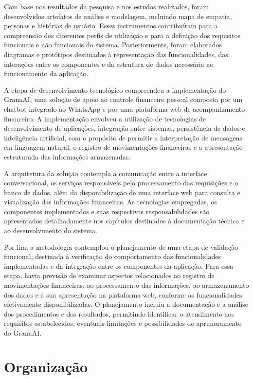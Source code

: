 Com base nos resultados da pesquisa e nos estudos realizados, foram desenvolvidos artefatos de análise e modelagem, incluindo mapa de empatia, personas e histórias de usuário. Esses instrumentos contribuíram para a compreensão dos diferentes perfis de utilização e para a definição dos requisitos funcionais e não funcionais do sistema. Posteriormente, foram elaborados diagramas e protótipos destinados à representação das funcionalidades, das interações entre os componentes e da estrutura de dados necessária ao funcionamento da aplicação.

A etapa de desenvolvimento tecnológico compreendeu a implementação do GranaAI, uma solução de apoio ao controle financeiro pessoal composta por um chatbot integrado ao WhatsApp e por uma plataforma web de acompanhamento financeiro. A implementação envolveu a utilização de tecnologias de desenvolvimento de aplicações, integração entre sistemas, persistência de dados e inteligência artificial, com o propósito de permitir a interpretação de mensagens em linguagem natural, o registro de movimentações financeiras e a apresentação estruturada das informações armazenadas.

A arquitetura da solução contempla a comunicação entre a interface conversacional, os serviços responsáveis pelo processamento das requisições e o banco de dados, além da disponibilização de uma interface web para consulta e visualização das informações financeiras. As tecnologias empregadas, os componentes implementados e suas respectivas responsabilidades são apresentados detalhadamente nos capítulos destinados à documentação técnica e ao desenvolvimento do sistema.

Por fim, a metodologia contemplou o planejamento de uma etapa de validação funcional, destinada à verificação do comportamento das funcionalidades implementadas e da integração entre os componentes da aplicação. Para essa etapa, havia previsão de examinar aspectos relacionados ao registro de movimentações financeiras, ao processamento das informações, ao armazenamento dos dados e à sua apresentação na plataforma web, conforme as funcionalidades efetivamente disponibilizadas. O planejamento incluiu a documentação e a análise dos procedimentos e dos resultados, permitindo identificar o atendimento aos requisitos estabelecidos, eventuais limitações e possibilidades de aprimoramento do GranaAI.

\section{Organização}


